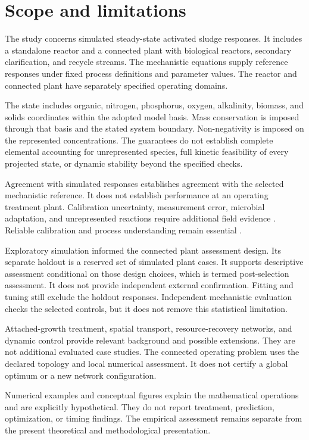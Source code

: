 \section{Scope and limitations}

The study concerns simulated steady-state activated sludge responses. It includes a standalone reactor and a connected plant with biological reactors, secondary clarification, and recycle streams. The mechanistic equations supply reference responses under fixed process definitions and parameter values. The reactor and connected plant have separately specified operating domains.

The state includes organic, nitrogen, phosphorus, oxygen, alkalinity, biomass, and solids coordinates within the adopted model basis. Mass conservation is imposed through that basis and the stated system boundary. Non-negativity is imposed on the represented concentrations. The guarantees do not establish complete elemental accounting for unrepresented species, full kinetic feasibility of every projected state, or dynamic stability beyond the specified checks.

Agreement with simulated responses establishes agreement with the selected mechanistic reference. It does not establish performance at an operating treatment plant. Calibration uncertainty, measurement error, microbial adaptation, and unrepresented reactions require additional field evidence \citep{Machado2014,Newhart2019}. Reliable calibration and process understanding remain essential \citep{Petersen2003,Meijer2004}.

Exploratory simulation informed the connected plant assessment design. Its separate holdout is a reserved set of simulated plant cases. It supports descriptive assessment conditional on those design choices, which is termed post-selection assessment. It does not provide independent external confirmation. Fitting and tuning still exclude the holdout responses. Independent mechanistic evaluation checks the selected controls, but it does not remove this statistical limitation.

Attached-growth treatment, spatial transport, resource-recovery networks, and dynamic control provide relevant background and possible extensions. They are not additional evaluated case studies. The connected operating problem uses the declared topology and local numerical assessment. It does not certify a global optimum or a new network configuration.

Numerical examples and conceptual figures explain the mathematical operations and are explicitly hypothetical. They do not report treatment, prediction, optimization, or timing findings. The empirical assessment remains separate from the present theoretical and methodological presentation.
